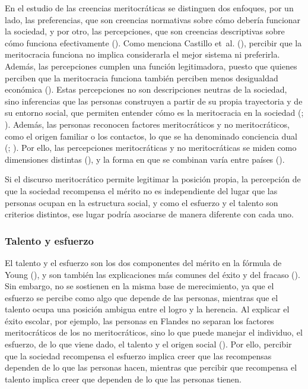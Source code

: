 \documentclass[
  spanish,
  a4paper,
  oneside]{scrbook}
\begin{document}
En el estudio de las creencias meritocráticas se distinguen dos
enfoques, por un lado, las preferencias, que son creencias normativas
sobre cómo debería funcionar la sociedad, y por otro, las percepciones,
que son creencias descriptivas sobre cómo funciona efectivamente
().
Como menciona Castillo et~al.
(), percibir que la
meritocracia funciona no implica considerarla el mejor sistema ni
preferirla. Además, las percepciones cumplen una función legitimadora,
puesto que quienes perciben que la meritocracia funciona también
perciben menos desigualdad económica
(). Estas percepciones no son descripciones neutras de la sociedad,
sino inferencias que las personas construyen a partir de su propia
trayectoria y de su entorno social, que permiten entender cómo es la
meritocracia en la sociedad (; ).
Además, las personas reconocen factores meritocráticos y no
meritocráticos, como el origen familiar o los contactos, lo que se ha
denominado conciencia dual
(;
). Por ello,
las percepciones meritocráticas y no meritocráticas se miden como
dimensiones distintas
(), y la forma en que se combinan varía entre países
().

Si el discurso meritocrático permite legitimar la posición propia, la
percepción de que la sociedad recompensa el mérito no es independiente
del lugar que las personas ocupan en la estructura social, y como el
esfuerzo y el talento son criterios distintos, ese lugar podría
asociarse de manera diferente con cada uno.

\subsubsection{Talento y esfuerzo}\label{talento-y-esfuerzo}

El talento y el esfuerzo son los dos componentes del mérito en la
fórmula de Young (), y son también las
explicaciones más comunes del éxito y del fracaso
(). Sin
embargo, no se sostienen en la misma base de merecimiento, ya que el
esfuerzo se percibe como algo que depende de las personas, mientras que
el talento ocupa una posición ambigua entre el logro y la herencia. Al
explicar el éxito escolar, por ejemplo, las personas en Flandes no
separan los factores meritocráticos de los no meritocráticos, sino lo
que puede manejar el individuo, el esfuerzo, de lo que viene dado, el
talento y el origen social
(). Por ello, percibir que la sociedad recompensa el
esfuerzo implica creer que las recompensas dependen de lo que las
personas hacen, mientras que percibir que recompensa el talento implica
creer que dependen de lo que las personas tienen.
\end{document}
